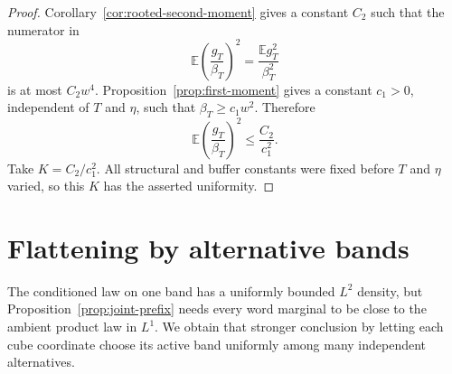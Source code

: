\documentclass[11pt]{article}
\numberwithin{equation}{section}
\theoremstyle{plain}
\newcommand{\E}{\mathbb E}
\newcommand{\1}{\mathbf 1}
\begin{document}
\begin{proof}
Corollary~\ref{cor:rooted-second-moment} gives a constant $C_2$ such that
the numerator in
\[
 \E\left(\frac{g_T}{\beta_T}\right)^2
 =\frac{\E g_T^2}{\beta_T^2}
\]
is at most $C_2w^4$.  Proposition~\ref{prop:first-moment} gives a constant
$c_1>0$, independent of $T$ and $\eta$, such that
$\beta_T\ge c_1w^2$.  Therefore
\[
 \E\left(\frac{g_T}{\beta_T}\right)^2
 \le\frac{C_2}{c_1^2}.
\]
Take $K=C_2/c_1^2$.  All structural and buffer constants were fixed before
$T$ and $\eta$ varied, so this $K$ has the asserted uniformity.
\end{proof}

\section{Flattening by alternative bands}\label{sec:flattening}

The conditioned law on one band has a uniformly bounded $L^2$ density, but
Proposition~\ref{prop:joint-prefix} needs every word marginal to be close to
the ambient product law in $L^1$.  We obtain that stronger conclusion by
letting each cube coordinate choose its active band uniformly among many
independent alternatives.
\end{document}
